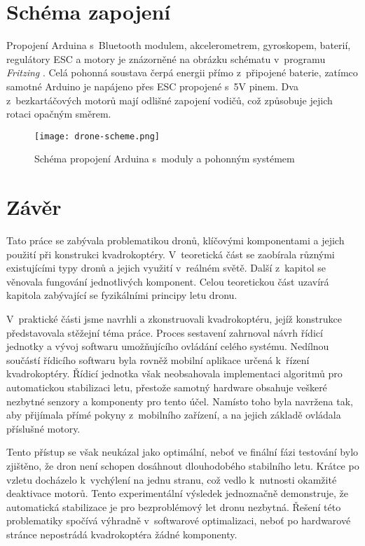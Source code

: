 \documentclass[12pt]{report}
\begin{document}
\chapter[Schéma zapojení]{Schéma zapojení}
Propojení Arduina s~Bluetooth modulem, akcelerometrem, gyroskopem, baterií, regulátory ESC a motory je znázorněné na obrázku schématu v~programu \textit{Fritzing} \cite{fritzing}. Celá pohonná soustava čerpá energii přímo z~připojené baterie, zatímco samotné Arduino je napájeno přes ESC propojené s~5V pinem. Dva z~bezkartáčových motorů mají odlišné zapojení vodičů, což způsobuje jejich rotaci opačným směrem.

\vspace{40pt}
\begin{figure}[H]
	\centering
	\texttt{[image: drone-scheme.png]}
	\caption{Schéma propojení Arduina s~moduly a pohonným systémem \cite{fritzing}}
	\label{fig:drone-scheme.png}
\end{figure}

\chapter*{Závěr}
	
Tato práce se zabývala problematikou dronů, klíčovými komponentami a jejich použití při konstrukci kvadrokoptéry. V~teoretická část se zaobírala různými existujícími typy dronů a jejich využití v~reálném světě. Další z~kapitol se věnovala fungování jednotlivých komponent. Celou teoretickou část uzavírá kapitola zabývající se fyzikálními principy letu dronu.

V~praktické části jsme navrhli a zkonstruovali kvadrokoptéru, jejíž konstrukce představovala stěžejní téma práce. Proces sestavení zahrnoval návrh řídicí jednotky a vývoj softwaru umožňujícího ovládání celého systému. Nedílnou součástí řídicího softwaru byla rovněž mobilní aplikace určená k~řízení kvadrokoptéry. Řídicí jednotka však neobsahovala implementaci algoritmů pro automatickou stabilizaci letu, přestože samotný hardware obsahuje veškeré nezbytné senzory a komponenty pro tento účel. Namísto toho byla navržena tak, aby přijímala přímé pokyny z~mobilního zařízení, a na jejich základě ovládala příslušné motory.

Tento přístup se však neukázal jako optimální, neboť ve finální fázi testování bylo zjištěno, že dron není schopen dosáhnout dlouhodobého stabilního letu. Krátce po vzletu docházelo k~vychýlení na jednu stranu, což vedlo k~nutnosti okamžité deaktivace motorů. Tento experimentální výsledek jednoznačně demonstruje, že automatická stabilizace je pro bezproblémový let dronu nezbytná. Řešení této problematiky spočívá výhradně v~softwarové optimalizaci, neboť po hardwarové stránce nepostrádá kvadrokoptéra žádné komponenty.
\end{document}
